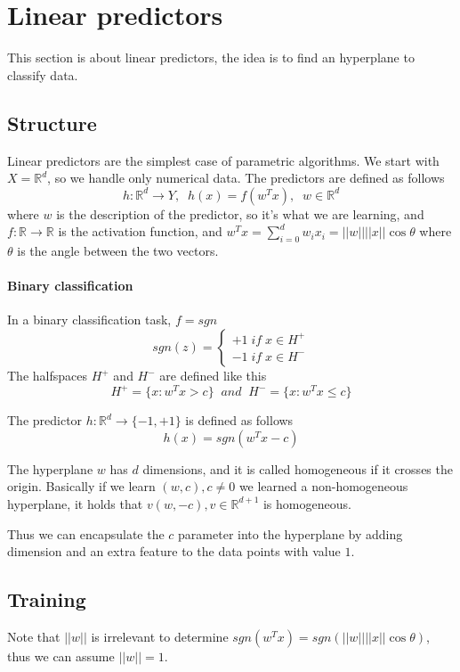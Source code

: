 \section{Linear predictors}
This section is about linear predictors, the idea is to find an hyperplane 
to classify data.

\subsection{Structure}
Linear predictors are the simplest case of 
parametric algorithms.
We start with $X = \mathbb{R}^d$, so we handle only numerical
data. The predictors are defined as follows 
$$h : \mathbb{R}^d \rightarrow Y, \;\; h(x) = f(w^Tx), \;\; w \in \mathbb{R}^d$$
where $w$ is the description of the predictor, so it's what we are 
learning, and $f : \mathbb{R} \rightarrow \mathbb{R}$ is the activation function, 
and $w^Tx = \sum_{i=0}^d w_ix_i = ||w||||x|| \cos \theta$ where $\theta$
is the angle between the two vectors.

\paragraph{Binary classification}
In a binary classification task, $f = \mathit{sgn}$ 
\[
    \mathit{sgn}(z) = \begin{cases}
        +1 \mathit{\;if\;} x \in H^+\\
        -1 \mathit{\;if\;} x \in H^-
    \end{cases}\]
The halfspaces $H^+$ and $H^-$ are defined like this
$$H^+ = \big\{ x : w^Tx > c\big\} \;\;\mathit{and}\;\; H^- = \big\{ x : w^Tx \leq c\big\}$$

The predictor $h : \mathbb{R}^d \rightarrow \{-1, +1\}$ is defined 
as follows
$$h(x) = \mathit{sgn}(w^Tx - c)$$

The hyperplane $w$ has $d$ dimensions, and it is called homogeneous
if it crosses the origin. Basically if we learn $(w, c), c\neq 0$ we learned 
a non-homogeneous hyperplane, it holds that $v(w, -c), v\in \mathbb{R}^{d+1}$ is homogeneous.

Thus we can encapsulate the $c$ parameter into the hyperplane by adding 
dimension and an extra feature to the data points with value $1$.

\subsection{Training}
Note that $||w||$ is irrelevant to determine $\mathit{sgn}(w^Tx)
= \mathit{sgn}(||w||||x||\cos \theta)$, thus we can assume $||w|| = 1$.

